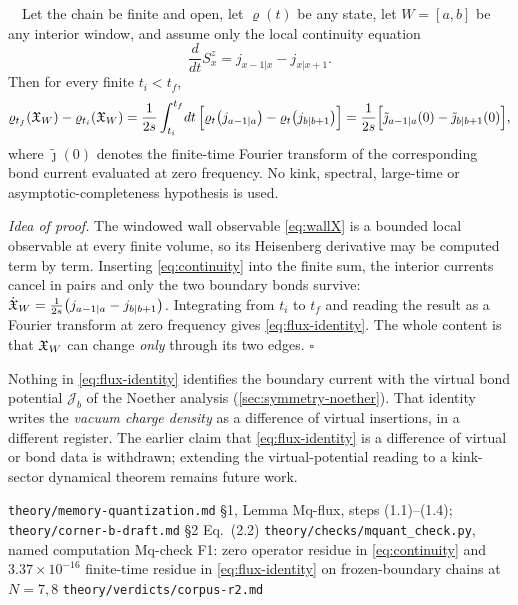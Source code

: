 \begin{theorem}
\label{thm:M-flux}
\statusProved\ \ Let the chain be finite and open, let $\varrho(t)$ be any
state, let $W=[a,b]$ be any interior window, and assume only the local
continuity equation
\begin{equation}
  \frac{d}{dt}S^z_x=j_{x-1|x}-j_{x|x+1}.
  \label{eq:continuity}
\end{equation}
Then for every finite $t_i<t_f$,
\begin{equation}
  \varrho_{t_f}(\mathfrak{X}_W)-\varrho_{t_i}(\mathfrak{X}_W)
  =\frac{1}{2s}\int_{t_i}^{t_f}\!dt\,
   \Bigl[\varrho_t\bigl(j_{a-1|a}\bigr)-\varrho_t\bigl(j_{b|b+1}\bigr)\Bigr]
  =\frac{1}{2s}\Bigl[\tilde\jmath_{a-1|a}(0)-\tilde\jmath_{b|b+1}(0)\Bigr],
  \label{eq:flux-identity}
\end{equation}
where $\tilde\jmath(0)$ denotes the finite-time Fourier transform of the
corresponding bond current evaluated at zero frequency. No kink, spectral,
large-time or asymptotic-completeness hypothesis is used.
\end{theorem}

\noindent\emph{Idea of proof.} The windowed wall observable \eqref{eq:wallX} is
a bounded local observable at every finite volume, so its Heisenberg derivative
may be computed term by term. Inserting \eqref{eq:continuity} into the finite
sum, the interior currents cancel in pairs and only the two boundary bonds
survive:
$\dot{\mathfrak{X}}_W=\tfrac{1}{2s}\bigl(j_{a-1|a}-j_{b|b+1}\bigr)$. Integrating from
$t_i$ to $t_f$ and reading the result as a Fourier transform at zero frequency
gives \eqref{eq:flux-identity}. The whole content is that $\mathfrak{X}_W$ can change
\emph{only} through its two edges. \hfill$\square$

\begin{remark}
\label{rem:physical-current}
Nothing in \eqref{eq:flux-identity} identifies the boundary current with the
virtual bond potential $\mathcal J_b$ of the Noether analysis
(\cref{sec:symmetry-noether}). That identity writes the \emph{vacuum charge
density} as a difference of virtual insertions, in a different register. The
earlier claim that \eqref{eq:flux-identity} is a difference of virtual or bond
data is withdrawn; extending the virtual-potential reading to a kink-sector
dynamical theorem remains future work.
\end{remark}

%
{\texttt{theory/memory-quantization.md} \S1, Lemma Mq-flux, steps
 (1.1)--(1.4); \texttt{theory/corner-b-draft.md} \S2 Eq.\ (2.2)}%
{\texttt{theory/checks/mquant\_check.py}, named computation Mq-check F1: zero
 operator residue in \eqref{eq:continuity} and $3.37\times10^{-16}$
 finite-time residue in \eqref{eq:flux-identity} on frozen-boundary chains at
 $N=7,8$}%
{\texttt{theory/verdicts/corpus-r2.md}}

